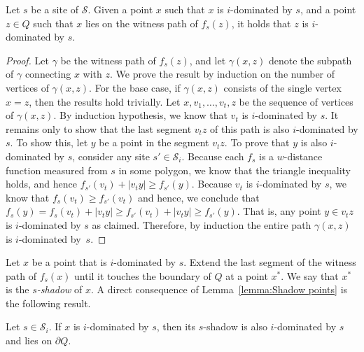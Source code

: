 \documentclass[a4paper,UKenglish]{socg-lipics-v2018}
\newcommand{\icell}[1][i]{${#1}$-patch\xspace}
\newcommand{\idom}[1][i]{${#1}$-dominated\xspace}
\newcommand{\s}{\mathcal S}
\begin{document}
\begin{lemma}\label{lemma:Shadow points}
Let $s$ be a site of $\s$.
Given a point $x$ such that $x$ is \idom by $s$, and a point $z\in Q$ such that $x$ lies on the witness path of $f_s(z)$,
it holds that $z$ is \idom by $s$. 
\end{lemma}
\begin{proof}
Let $\gamma$ be the witness path of $f_s(z)$, and let $\gamma(x, z)$ denote the subpath of $\gamma$ connecting $x$ with $z$.
We prove the result by induction on the number of vertices of $\gamma(x, z)$.
For the base case, if $\gamma(x, z)$ consists of the single vertex $x = z$, then the results hold trivially. 
Let $x , v_1, \ldots, v_t,  z$ be the sequence of vertices of $\gamma(x, z)$. 
By induction hypothesis, we know that $v_t$ is \idom by $s$.
It remains only to show that the last segment $v_t z$ of this path is also \idom by $s$.
To show this, let $y$ be a point in the segment $v_t z$.
To prove that $y$  is also \idom by $s$, consider any site $s'\in \s_i$. 
Because each $f_s$ is a $w$-distance function measured from $s$ in some polygon, we know that the triangle inequality holds, and hence $f_{s'}(v_t) + |v_t y| \geq f_{s'}(y)$.
Because $v_t$ is \idom by $s$, we know that $f_s(v_t) \geq f_{s'}(v_t)$ and hence, we conclude that 
$f_s(y) = f_s(v_t) + |v_t y| \geq f_{s'}(v_t) + |v_t y| \geq f_{s'}(y)$.
That is, any point $y\in v_t z$ is \idom by $s$ as claimed.
Therefore, by induction the entire path $\gamma(x, z)$ is \idom by~$s$.
\end{proof}

Let $x$ be a point that is \idom by $s$. Extend the last segment of the witness path of $f_s(x)$ until it touches the boundary of $Q$ at a point $x^*$.
We say that $x^*$ is the \emph{$s$-shadow} of $x$. A direct consequence of Lemma~\ref{lemma:Shadow points} is the following result.

\begin{corollary}\label{corollary: Shadows in cell as well}
Let $s \in \s_i$.
If $x$ is \idom by $s$, then its $s$-shadow is also \idom by $s$ and lies on $\partial Q$.
\end{corollary}


\end{document}
